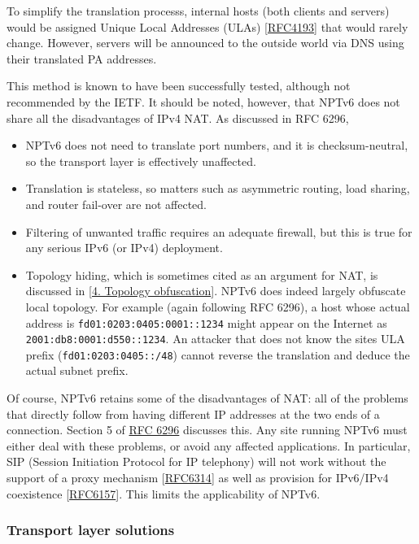 \documentclass[
]{article}
\begin{document}
To simplify the translation processs, internal hosts (both clients and
servers) would be assigned Unique Local Addresses (ULAs)
{[}\href{https://www.rfc-editor.org/info/rfc4193}{RFC4193}{]} that would
rarely change. However, servers will be announced to the outside world
via DNS using their translated PA addresses.

This method is known to have been successfully tested, although not
recommended by the IETF. It should be noted, however, that NPTv6 does
not share all the disadvantages of IPv4 NAT. As discussed in RFC 6296,

\begin{itemize}
\item
  NPTv6 does not need to translate port numbers, and it is
  checksum-neutral, so the transport layer is effectively unaffected.
\item
  Translation is stateless, so matters such as asymmetric routing, load
  sharing, and router fail-over are not affected.
\item
  Filtering of unwanted traffic requires an adequate firewall, but this
  is true for any serious IPv6 (or IPv4) deployment.
\item
  Topology hiding, which is sometimes cited as an argument for NAT, is
  discussed in {[}\hyperref[topology-obfuscation]{4. Topology
  obfuscation}{]}. NPTv6 does indeed largely obfuscate local topology.
  For example (again following RFC 6296), a host whose actual address is
  \texttt{fd01:0203:0405:0001::1234} might appear on the Internet as
  \texttt{2001:db8:0001:d550::1234}. An attacker that does not know the
  site\textquotesingle s ULA prefix (\texttt{fd01:0203:0405::/48})
  cannot reverse the translation and deduce the actual subnet prefix.
\end{itemize}

Of course, NPTv6 retains some of the disadvantages of NAT: all of the
problems that directly follow from having different IP addresses at the
two ends of a connection. Section 5 of
\href{https://www.rfc-editor.org/info/rfc6296}{RFC 6296} discusses this.
Any site running NPTv6 must either deal with these problems, or avoid
any affected applications. In particular, SIP (Session Initiation
Protocol for IP telephony) will not work without the support of a proxy
mechanism {[}\href{https://www.rfc-editor.org/info/rfc6314}{RFC6314}{]}
as well as provision for IPv6/IPv4 coexistence
{[}\href{https://www.rfc-editor.org/info/rfc6157}{RFC6157}{]}. This
limits the applicability of NPTv6.

\subsubsection{Transport layer
solutions}\label{transport-layer-solutions}
\end{document}
